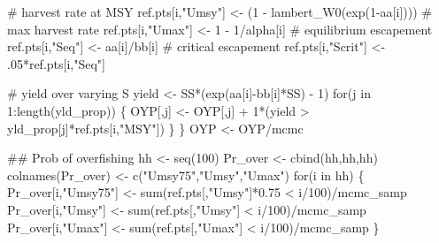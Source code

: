 \documentclass[
  11pt,
]{article}
\newenvironment{Shaded}{}{}
\newcommand{\CommentTok}[1]{\textcolor[rgb]{0.00,0.50,0.00}{#1}}
\newcommand{\ControlFlowTok}[1]{\textcolor[rgb]{0.00,0.00,1.00}{#1}}
\newcommand{\DecValTok}[1]{#1}
\newcommand{\FloatTok}[1]{#1}
\newcommand{\KeywordTok}[1]{\textcolor[rgb]{0.00,0.00,1.00}{#1}}
\newcommand{\NormalTok}[1]{#1}
\newcommand{\OperatorTok}[1]{#1}
\newcommand{\StringTok}[1]{\textcolor[rgb]{0.00,0.50,0.50}{#1}}
\begin{document}
\begin{Shaded}
\begin{Highlighting}[]
  \CommentTok{# harvest rate at MSY}
\NormalTok{  ref.pts[i,}\StringTok{"Umsy"}\NormalTok{] <-}\StringTok{ }\NormalTok{(}\DecValTok{1} \OperatorTok{-}\StringTok{ }\KeywordTok{lambert_W0}\NormalTok{(}\KeywordTok{exp}\NormalTok{(}\DecValTok{1}\OperatorTok{-}\NormalTok{aa[i])))}
  \CommentTok{# max harvest rate}
\NormalTok{  ref.pts[i,}\StringTok{"Umax"}\NormalTok{] <-}\StringTok{ }\DecValTok{1} \OperatorTok{-}\StringTok{ }\DecValTok{1}\OperatorTok{/}\NormalTok{alpha[i]}
  \CommentTok{# equilibrium escapement}
\NormalTok{  ref.pts[i,}\StringTok{"Seq"}\NormalTok{] <-}\StringTok{ }\NormalTok{aa[i]}\OperatorTok{/}\NormalTok{bb[i]}
  \CommentTok{# critical escapement}
\NormalTok{  ref.pts[i,}\StringTok{"Scrit"}\NormalTok{] <-}\StringTok{ }\FloatTok{.05}\OperatorTok{*}\NormalTok{ref.pts[i,}\StringTok{"Seq"}\NormalTok{]}
  
  \CommentTok{# yield over varying S}
\NormalTok{  yield <-}\StringTok{ }\NormalTok{SS}\OperatorTok{*}\NormalTok{(}\KeywordTok{exp}\NormalTok{(aa[i]}\OperatorTok{-}\NormalTok{bb[i]}\OperatorTok{*}\NormalTok{SS) }\OperatorTok{-}\StringTok{ }\DecValTok{1}\NormalTok{)}
  \ControlFlowTok{for}\NormalTok{(j }\ControlFlowTok{in} \DecValTok{1}\OperatorTok{:}\KeywordTok{length}\NormalTok{(yld_prop)) \{}
\NormalTok{    OYP[,j] <-}\StringTok{ }\NormalTok{OYP[,j] }\OperatorTok{+}\StringTok{ }\DecValTok{1}\OperatorTok{*}\NormalTok{(yield }\OperatorTok{>}\StringTok{ }\NormalTok{yld_prop[j]}\OperatorTok{*}\NormalTok{ref.pts[i,}\StringTok{"MSY"}\NormalTok{])}
\NormalTok{  \}}
\NormalTok{\}}
\NormalTok{OYP <-}\StringTok{ }\NormalTok{OYP}\OperatorTok{/}\NormalTok{mcmc}


\CommentTok{## Prob of overfishing}
\NormalTok{hh <-}\StringTok{ }\KeywordTok{seq}\NormalTok{(}\DecValTok{100}\NormalTok{)}
\NormalTok{Pr_over <-}\StringTok{ }\KeywordTok{cbind}\NormalTok{(hh,hh,hh)}
\KeywordTok{colnames}\NormalTok{(Pr_over) <-}\StringTok{ }\KeywordTok{c}\NormalTok{(}\StringTok{"Umsy75"}\NormalTok{,}\StringTok{"Umsy"}\NormalTok{,}\StringTok{"Umax"}\NormalTok{)}
\ControlFlowTok{for}\NormalTok{(i }\ControlFlowTok{in}\NormalTok{ hh) \{}
\NormalTok{  Pr_over[i,}\StringTok{"Umsy75"}\NormalTok{] <-}\StringTok{ }\KeywordTok{sum}\NormalTok{(ref.pts[,}\StringTok{"Umsy"}\NormalTok{]}\OperatorTok{*}\FloatTok{0.75} \OperatorTok{<}\StringTok{ }\NormalTok{i}\OperatorTok{/}\DecValTok{100}\NormalTok{)}\OperatorTok{/}\NormalTok{mcmc_samp}
\NormalTok{  Pr_over[i,}\StringTok{"Umsy"}\NormalTok{] <-}\StringTok{ }\KeywordTok{sum}\NormalTok{(ref.pts[,}\StringTok{"Umsy"}\NormalTok{] }\OperatorTok{<}\StringTok{ }\NormalTok{i}\OperatorTok{/}\DecValTok{100}\NormalTok{)}\OperatorTok{/}\NormalTok{mcmc_samp}
\NormalTok{  Pr_over[i,}\StringTok{"Umax"}\NormalTok{] <-}\StringTok{ }\KeywordTok{sum}\NormalTok{(ref.pts[,}\StringTok{"Umax"}\NormalTok{] }\OperatorTok{<}\StringTok{ }\NormalTok{i}\OperatorTok{/}\DecValTok{100}\NormalTok{)}\OperatorTok{/}\NormalTok{mcmc_samp}
\NormalTok{\}}


\end{Highlighting}
\end{Shaded}
\end{document}
